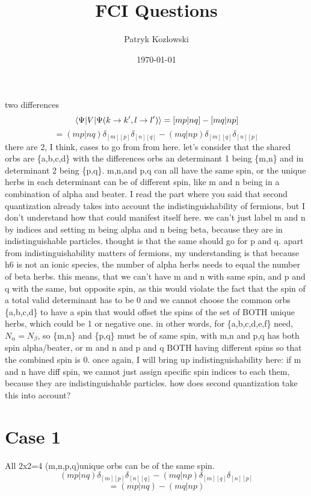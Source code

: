 \documentclass[12pt]{article}
\title{FCI Questions}
\author{Patryk Kozlowski}
\date{\today}
\begin{document}
\maketitle
two differences
\begin{equation}
    \mel{\Psi }{V}{\Psi (k\rightarrow k^{\prime}, l\rightarrow l^{\prime})}
    =[mp|nq]-[mq|np]
\end{equation}
\begin{equation}
    =(mp|nq)\delta _{[m][p]}\delta _{[n][q]}-(mq|np)\delta _{[m][q]}\delta _{[n][p]}
\end{equation}
 there are 2, I think, cases to go from from here. let's consider that the shared orbs are \{a,b,c,d\} with the differences orbs an determinant 1 being \{m,n\} and in determinant 2 being \{p,q\}. m,n,and p,q can all have the same spin, or the unique herbs in each determinant can be of different spin, like m and n being in a combination of alpha and beater. I read the part where you said that second quantization already takes into account the indistinguishability of fermions, but I don't understand how that could manifest itself here. we can't just label m and n by indices and setting m being alpha and n being beta, because they are in indistinguishable particles. thought is that the same should go for p and q. apart from indistinguishability matters of fermions, my understanding is that because h6 is not an ionic species, the number of alpha herbs needs to equal the number of beta herbs. this means, that we can't have m and n with same spin, and p and q with the same, but opposite spin, as this would violate the fact that the spin of a total valid determinant has to be 0 and we cannot choose the common orbs \{a,b,c,d\} to have a spin that would offset the spins of the set of BOTH unique herbs, which could be 1 or negative one. in other words, for \{a,b,c,d,e,f\} need, $N_{\alpha }=N_{\beta }$, so \{m,n\} and \{p,q\} must be of same spin, with m,n and p,q has both spin alpha/beater, or m and n and p and q BOTH having different spins so that the combined spin is 0. once again, I will bring up indistinguishability here: if m and n have diff spin, we cannot just assign specific spin indices to each them, because they are indistinguishable particles. how does second quantization take this into account? 
\section{Case 1}
All 2x2=4 (m,n,p,q)unique orbs can be of the same spin.
\begin{equation}
    (mp|nq)\delta _{[m][p]}\delta _{[n][q]}-(mq|np)\delta _{[m][q]}\delta _{[n][p]}
\end{equation}
\begin{equation}
    =(mp|nq)-(mq|np)
\end{equation}
\end{document}
